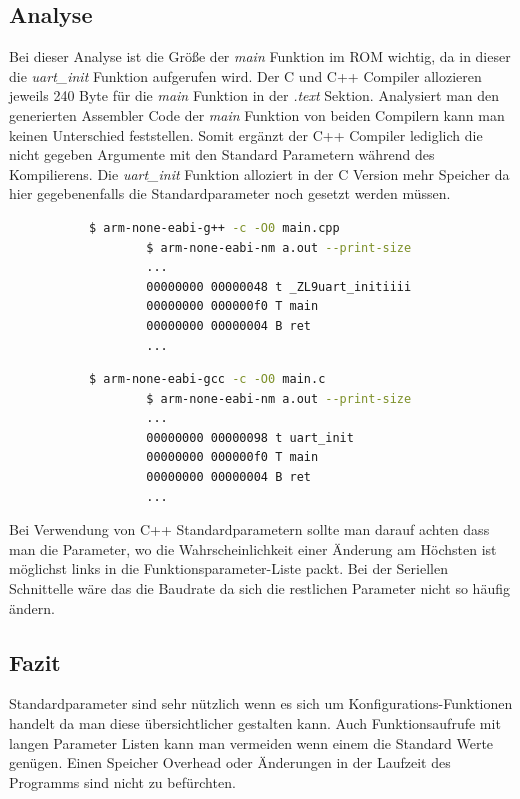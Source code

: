 \documentclass[MES,Master,ngerman]{twbook}%
\begin{document}
\subsection{Analyse}
Bei dieser Analyse ist die Größe der \textit{main} Funktion im ROM wichtig, da in dieser die \textit{uart\_init} Funktion aufgerufen wird. Der C und C++ Compiler allozieren jeweils 240 Byte für die \textit{main} Funktion in der \textit{.text} Sektion. Analysiert man den generierten Assembler Code der \textit{main} Funktion von beiden Compilern kann man keinen Unterschied feststellen. Somit ergänzt der C++ Compiler lediglich die nicht gegeben Argumente mit den Standard Parametern während des Kompilierens. Die \textit{uart\_init} Funktion alloziert in der C Version mehr Speicher da hier gegebenenfalls die Standardparameter noch gesetzt werden müssen.

\begin{figure}[!htb]
	\begin{subfigure}[b]{0.5\textwidth}
		\begin{lstlisting}[gobble=6, title={Analyse C++}, language=bash, numbers=none]
		$ arm-none-eabi-g++ -c -O0 main.cpp
		$ arm-none-eabi-nm a.out --print-size
		...
		00000000 00000048 t _ZL9uart_initiiii
		00000000 000000f0 T main
		00000000 00000004 B ret
		...
		\end{lstlisting}
	\end{subfigure}
	\begin{subfigure}[b]{0.5\textwidth}
		\begin{lstlisting}[gobble=6, title={Analyse C}, language=bash, numbers=none]
		$ arm-none-eabi-gcc -c -O0 main.c
		$ arm-none-eabi-nm a.out --print-size
		...
		00000000 00000098 t uart_init
		00000000 000000f0 T main
		00000000 00000004 B ret
		...
		\end{lstlisting}
	\end{subfigure}
\end{figure}
Bei Verwendung von C++ Standardparametern sollte man darauf achten dass man die Parameter, wo die Wahrscheinlichkeit einer Änderung am Höchsten ist möglichst links in die Funktionsparameter-Liste packt. Bei der Seriellen Schnittelle wäre das die Baudrate da sich die restlichen Parameter nicht so häufig ändern.  

\subsection{Fazit}
Standardparameter sind sehr nützlich wenn es sich um Konfigurations-Funktionen handelt da man diese übersichtlicher gestalten kann. Auch Funktionsaufrufe mit langen Parameter Listen kann man vermeiden wenn einem die Standard Werte genügen. Einen Speicher Overhead oder Änderungen in der Laufzeit des Programms sind nicht zu befürchten.
\end{document}
